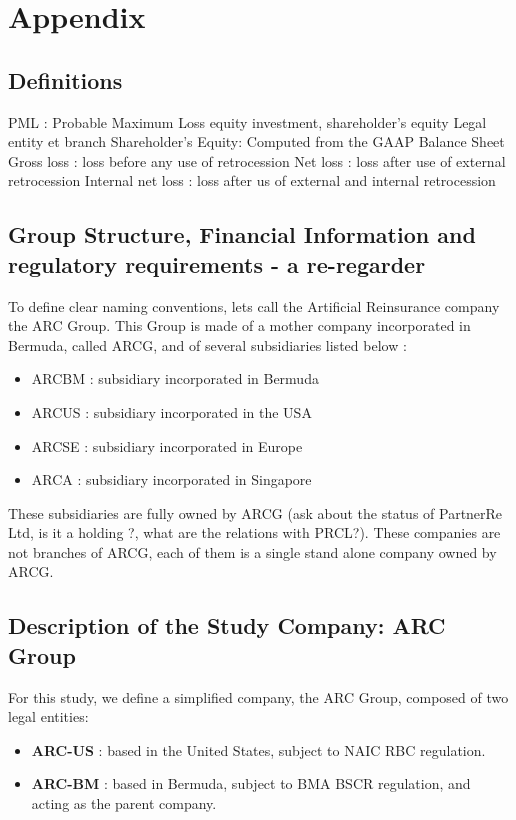 \chapter{Appendix}
\label{sec:APPENDIX}


\section{Definitions}

PML : Probable Maximum Loss
equity investment, shareholder's equity
Legal entity et branch
Shareholder’s Equity: Computed from the GAAP Balance Sheet
Gross loss : loss before any use of retrocession
Net loss : loss after use of external retrocession
Internal net loss : loss after us of external and internal retrocession


\section{Group Structure, Financial Information and regulatory requirements - a re-regarder}

To define clear naming conventions, lets call the Artificial Reinsurance company the ARC Group. This Group is made of a mother company incorporated in Bermuda, called ARCG, and of several subsidiaries listed below :


\begin{itemize}
\item ARCBM : subsidiary incorporated in Bermuda
\item ARCUS : subsidiary incorporated in the USA
\item ARCSE : subsidiary incorporated in Europe
\item ARCA : subsidiary incorporated in Singapore
\end{itemize}

These subsidiaries are fully owned by ARCG (ask about the status of PartnerRe Ltd, is it a holding ?, what are the relations with PRCL?). These companies are not branches of ARCG, each of them is a single stand alone company owned by ARCG.



\section{Description of the Study Company: ARC Group}

For this study, we define a simplified company, the ARC Group, composed of two legal entities:
\begin{itemize}
    \item \textbf{ARC-US} : based in the United States, subject to NAIC RBC regulation.
    \item \textbf{ARC-BM} : based in Bermuda, subject to BMA BSCR regulation, and acting as the parent company.
\end{itemize}

